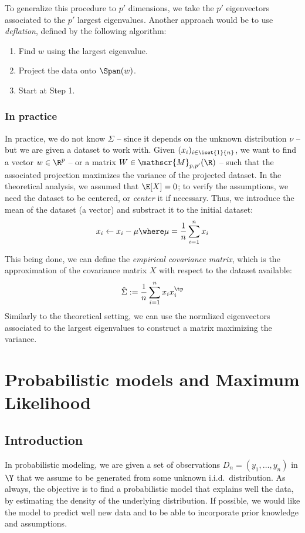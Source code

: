 \documentclass[toc, titlepaged]{../cs-classes/cs-classes}
\begin{document}
\begin{remark}
    To generalize this procedure to $p'$ dimensions, we take the $p'$ eigenvectors associated to the $p'$ largest eigenvalues. Another approach would be to use \emph{deflation}, defined by the following algorithm:
    \begin{enumerate}
        \item Find $w$ using the largest eigenvalue.
        \item Project the data onto $\Span(w)$.
        \item Start at Step 1.
    \end{enumerate}
\end{remark}

\subsubsection{In practice}
In practice, we do not know $\Sigma$ -- since it depends on the unknown distribution $\nu$ -- but we are given a dataset to work with. Given $(x_i)_{i\in\iset{1}{n}}$, we want to find a vector $w\in\R^p$ -- or a matrix $W\in\mathscr{M}_{p, p'}(\R)$ -- such that the associated projection maximizes the variance of the projected dataset. In the theoretical analysis, we assumed that $\E[X]=0$; to verify the assumptions, we need the dataset to be centered, or \emph{center} it if necessary. Thus, we introduce the mean of the dataset (a vector) and substract it to the initial dataset:
\begin{equation*}
    x_i\leftarrow x_i-\mu \where \mu=\frac{1}{n}\sum_{i=1}^n x_i
\end{equation*}

This being done, we can define the \emph{empirical covariance matrix}, which is the approximation of the covariance matrix $X$ with respect to the dataset available:
\begin{equation*}
    \hat{\Sigma} := \frac{1}{n} \sum_{i=1}^n  x_ix_i^\tp
\end{equation*}
Similarly to the theoretical setting, we can use the normlized eigenvectors associated to the largest eigenvalues to construct a matrix maximizing the variance.

\section{Probabilistic models and Maximum Likelihood}
\subsection{Introduction}
In probabilistic modeling, we are given a set of observations $D_n=(y_1, \dots, y_n)$ in $\Y$ that we assume to be generated from some unknown i.i.d.~distribution. As always, the objective is to find a probabilistic model that explains well the data, by estimating the density of the underlying distribution. If possible, we would like the model to predict well new data and to be able to incorporate prior knowledge and assumptions.
\end{document}
